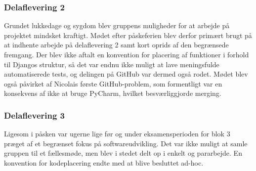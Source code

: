 \documentclass[]{article}
\begin{document}
\subsubsection{Delaflevering 2}
\noindent Grundet lukkedage og sygdom blev gruppens muligheder for at arbejde på projektet mindsket kraftigt. Mødet efter påskeferien blev derfor primært brugt på at indhente arbejde på delaflevering 2 samt kort oprids af den begrænsede fremgang. Der blev ikke aftalt en konvention for placering af funktioner i forhold til Djangos struktur, så det var endnu ikke muligt at lave meningsfulde automatiserede tests, og delingen på GitHub var dermed også rodet. Mødet blev også påvirket af Nicolais første GitHub-problem, som formentligt var en konsekvens af ikke at bruge PyCharm, hvilket besværliggjorde merging.

\subsubsection{Delaflevering 3}
\noindent Ligesom i påsken var ugerne lige før og under eksamensperioden for blok 3 præget af et begrænset fokus på softwareudvikling. Det var ikke muligt at samle gruppen til et fællesmøde, men blev i stedet delt op i enkelt og pararbejde. En konvention for kodeplacering endte med at blive besluttet ad-hoc.
\end{document}
